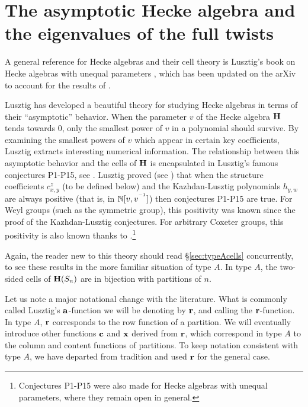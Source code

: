\section{The asymptotic Hecke algebra and the eigenvalues of the full twists}
\label{sec:cellsplus}

A general reference for Hecke algebras and their cell theory is Lusztig's book on Hecke algebras with unequal parameters \cite{LuszUnequal14}, which has been updated on the
arXiv to account for the results of \cite{EWHodge}.

Lusztig has developed a beautiful theory for studying Hecke algebras in terms of their ``asymptotic'' behavior. When the parameter $v$ of the Hecke algebra ${\mathbf H}$ tends towards $0$, only the smallest power of $v$ in a polynomial should survive. By examining the smallest powers of $v$ which appear in certain key coefficients, Lusztig extracts interesting numerical information. The relationship between this asymptotic behavior and the cells of ${\mathbf H}$ is encapsulated in Lusztig's famous conjectures P1-P15, see \cite[Section 14]{LuszUnequal14}. Lusztig proved (see \cite[Section 15]{LuszUnequal14}) that when the structure coefficients $c^z_{x,y}$ (to be defined below) and the Kazhdan-Lusztig polynomials $h_{y,w}$ are always positive (that is, in ${\mathbb{N}}[v,v^{^{-1}}]$) then conjectures P1-P15 are true. For Weyl groups (such as the symmetric group), this positivity was known since the proof of the Kazhdan-Lusztig conjectures. For arbitrary Coxeter groups, this positivity is also known thanks to \cite{EWHodge}.\footnote{Conjectures P1-P15 were also made for Hecke algebras with unequal parameters, where they remain open in general.}

Again, the reader new to this theory should read \S\ref{sec:typeAcells} concurrently, to see these results in the more familiar situation of type $A$. In type $A$, the two-sided cells of
${\mathbf H}(S_n)$ are in bijection with partitions of $n$.

Let us note a major notational change with the literature. What is commonly called Lusztig's ${\mathbf a}$-function we will be denoting by $\mathbf{r}$, and calling the $\mathbf{r}$-function. In type $A$,
$\mathbf{r}$ corresponds to the row function of a partition. We will eventually introduce other functions $\mathbf{c}$ and $\mathbf{x}$ derived from $\mathbf{r}$, which correspond in type $A$ to the column and
content functions of partitions. To keep notation consistent with type $A$, we have departed from tradition and used $\mathbf{r}$ for the general case.


